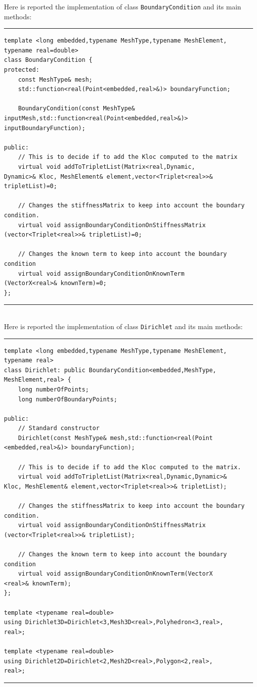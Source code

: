 Here is reported the implementation of class \verb|BoundaryCondition| and its main methods:

\noindent\rule{16cm}{1pt}
\begin{lstlisting}[caption=File \texttt{BoundaryCondition.h}]
template <long embedded,typename MeshType,typename MeshElement,
typename real=double>
class BoundaryCondition {
protected:
    const MeshType& mesh;
    std::function<real(Point<embedded,real>&)> boundaryFunction;

    BoundaryCondition(const MeshType&
inputMesh,std::function<real(Point<embedded,real>&)> 
inputBoundaryFunction);

public:
    // This is to decide if to add the Kloc computed to the matrix
    virtual void addToTripletList(Matrix<real,Dynamic,
Dynamic>& Kloc, MeshElement& element,vector<Triplet<real>>& 
tripletList)=0;
	
    // Changes the stiffnessMatrix to keep into account the boundary condition.
    virtual void assignBoundaryConditionOnStiffnessMatrix
(vector<Triplet<real>>& tripletList)=0;
	
    // Changes the known term to keep into account the boundary condition
    virtual void assignBoundaryConditionOnKnownTerm
(VectorX<real>& knownTerm)=0; 		
};

\end{lstlisting}

\noindent\rule{16cm}{1pt}\\

Here is reported the implementation of class \verb|Dirichlet| and its main methods:

\noindent\rule{16cm}{1pt}
\begin{lstlisting}[caption=File \texttt{Dirichlet.h}]
template <long embedded,typename MeshType,typename MeshElement,
typename real>
class Dirichlet: public BoundaryCondition<embedded,MeshType,
MeshElement,real> {
    long numberOfPoints;
    long numberOfBoundaryPoints;

public:
    // Standard constructor
    Dirichlet(const MeshType& mesh,std::function<real(Point
<embedded,real>&)> boundaryFunction);
	
    // This is to decide if to add the Kloc computed to the matrix.
    virtual void addToTripletList(Matrix<real,Dynamic,Dynamic>& 
Kloc, MeshElement& element,vector<Triplet<real>>& tripletList);
	
    // Changes the stiffnessMatrix to keep into account the boundary condition.
    virtual void assignBoundaryConditionOnStiffnessMatrix
(vector<Triplet<real>>& tripletList);
	
    // Changes the known term to keep into account the boundary condition
    virtual void assignBoundaryConditionOnKnownTerm(VectorX
<real>& knownTerm);	
};

template <typename real=double>
using Dirichlet3D=Dirichlet<3,Mesh3D<real>,Polyhedron<3,real>,
real>;

template <typename real=double>
using Dirichlet2D=Dirichlet<2,Mesh2D<real>,Polygon<2,real>,
real>;
\end{lstlisting}
\noindent\rule{16cm}{1pt}

